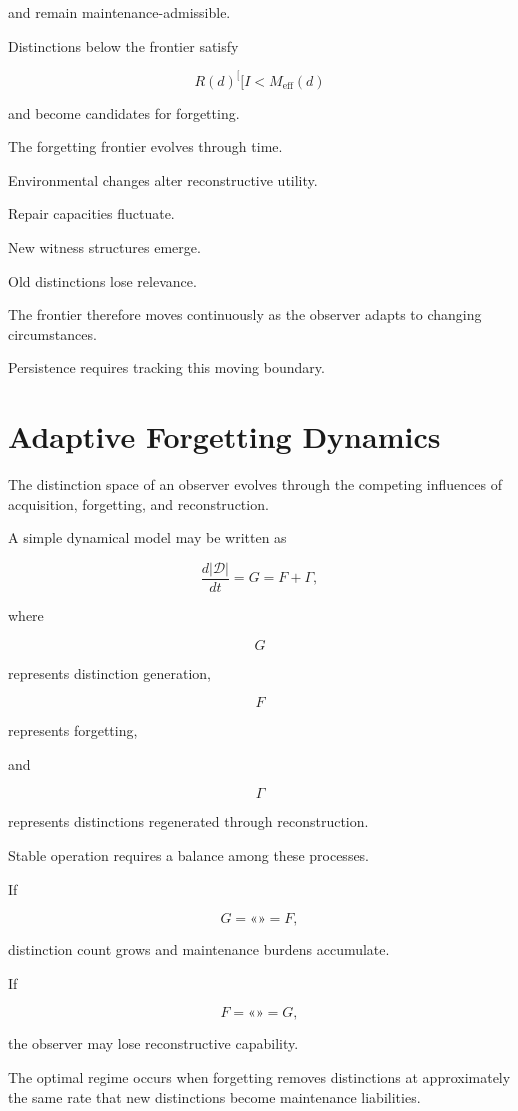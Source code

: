 \documentclass[12pt,oneside]{book}
\theoremstyle{plain} \newtheorem{theorem}{Theorem}[chapter] \newtheorem{lemma}[theorem]{Lemma} \newtheorem{proposition}[theorem]{Proposition} \newtheorem{corollary}[theorem]{Corollary}
\theoremstyle{definition} \newtheorem{definition}[theorem]{Definition} \newtheorem{axiom}[theorem]{Axiom} \newtheorem{construction}[theorem]{Construction}
\theoremstyle{remark} \newtheorem{remark}[theorem]{Remark} \newtheorem{example}[theorem]{Example}
\newcommand{\D}{\mathcal{D}} \newcommand{\R}{\mathcal{R}} \newcommand{\F}{\mathcal{F}} \newcommand{\U}{\mathcal{U}} \newcommand{\M}{\mathcal{M}} \newcommand{\G}{\Gamma}
\begin{document}
and remain maintenance-admissible.

Distinctions below the frontier satisfy

\[
R(d)
^[[I<
M_{\mathrm{eff}}(d)
\]

and become candidates for forgetting.

The forgetting frontier evolves through time.

Environmental changes alter reconstructive utility.

Repair capacities fluctuate.

New witness structures emerge.

Old distinctions lose relevance.

The frontier therefore moves continuously as the observer adapts to changing circumstances.

Persistence requires tracking this moving boundary.

\section{Adaptive Forgetting Dynamics}

The distinction space of an observer evolves through the competing influences of acquisition, forgetting, and reconstruction.

A simple dynamical model may be written as

\[
\frac{d|\D|}{dt}
=
G
=
F
+
\Gamma,
\]

where

\[
G
\]

represents distinction generation,

\[
F
\]

represents forgetting,

and

\[
\Gamma
\]

represents distinctions regenerated through reconstruction.

Stable operation requires a balance among these processes.

If

\[
G
=
«»
=
F,
\]

distinction count grows and maintenance burdens accumulate.

If

\[
F
=
«»
=
G,
\]

the observer may lose reconstructive capability.

The optimal regime occurs when forgetting removes distinctions at approximately the same rate that new distinctions become maintenance liabilities.
\end{document}
